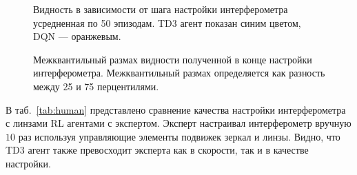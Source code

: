\begin{figure}[ht]
    \caption{Видность в зависимости от шага настройки интерферометра усредненная по 50 эпизодам.  TD3 агент показан синим цветом, DQN --- оранжевым.}
    \label{fig:results_a}
\end{figure}

\begin{figure}[ht]
\caption{Межквантильный размах видности полученной в конце настройки интерферометра. Межквантильный размах определяется как разность между 25 и 75 перцентилями.}
    \label{fig:results_b}
\end{figure}

В таб.~\ref{tab:human} представлено сравнение качества настройки интерферометра с линзами RL агентами с экспертом. Эксперт настраивал интерферометр вручную $10$ раз используя управляющие элементы подвижек зеркал и линзы. Видно, что TD3 агент также превосходит эксперта как в скорости, так и в качестве настройки.

